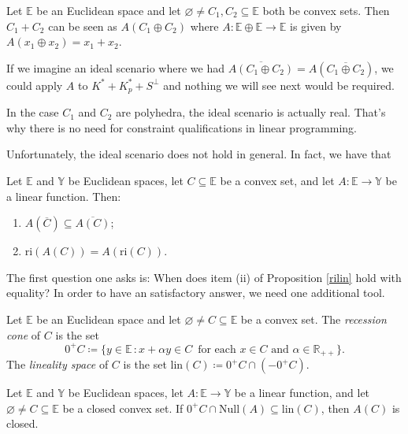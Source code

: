 \documentclass[a4paper]{article}
\begin{document}
Let \(\mathbb{E}\) be an Euclidean space and let
\(\varnothing\not=C_1,C_2\subseteq\mathbb{E}\) both be convex sets. Then
\(C_1+C_2\) can be seen as \(A(C_1\oplus C_2)\) where
\(A\colon\mathbb{E}\oplus\mathbb{E}\to\mathbb{E}\)
is given by \(A(x_1\oplus x_2)=x_1+x_2\). 

If we imagine an ideal scenario where we had \(\overline{A(C_1\oplus
  C_2)}=A(\overline{C_1\oplus C_2})\), we could apply \(A\) to
\mbox{\(K^\ast+K_p^\ast+S^\bot\)} and nothing we will see next would be
required. 

\begin{remark}
  In the case \(C_1\) and \(C_2\) are polyhedra, the ideal scenario is
  actually real. That's why there is no need for constraint
  qualifications in linear programming. 
\end{remark}

Unfortunately, the ideal scenario does not hold in general. In fact, we have that

\begin{lemma}\label{rilin}
Let \(\mathbb{E}\) and \(\mathbb{Y}\) be Euclidean spaces, let \(C\subseteq\mathbb{E}\) be a convex set, and let \(A\colon\mathbb{E}\to\mathbb{Y}\) be a linear function. Then:
\begin{enumerate}[label=(\roman*)]
\item\(A(\overline{C})\subseteq\overline{A(C)}\);
\item\(\text{ri}(A(C))=A(\text{ri}(C))\).
\end{enumerate}
\end{lemma}

The first question one asks is: When does item (ii) of Proposition
\ref{rilin} hold with equality? In order to have an satisfactory
answer, we need one additional tool.

\begin{definition}
  Let \(\mathbb{E}\) be an Euclidean space and let \(\varnothing\not =
  C\subseteq\mathbb{E}\) be a convex set. The \emph{recession cone} of \(C\)
  is the set
  \[0^+C\coloneqq\{y\in\mathbb{E}\,\colon x+\alpha y\in C\, \text{ for each } x\in
    C\text{ and } \alpha\in\mathbb{R}_{++}\}.\]
  The \emph{lineality space} of \(C\) is the set \(\text{lin}(C)\coloneqq 0^+C\cap(-0^+C)\).
\end{definition}


\begin{lemma}\label{imgfech}
  Let $\mathbb{E}$ and  $\mathbb{Y}$ be Euclidean spaces, let $A\colon\mathbb{E}\to\mathbb{Y}$ be a linear function, and let $\varnothing\not=C\subseteq \mathbb{E}$ be a closed convex set. If $0^+C\cap\text{Null}(A)\subseteq\text{lin}(C)$, then $A(C)$ is closed.  
\end{lemma}
\end{document}
